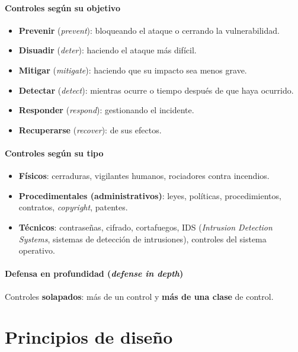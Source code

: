 \documentclass[11pt,a4paper]{report}
\begin{document}
\subsubsection*{Controles según su objetivo}
\begin{itemize}
  \item \textbf{Prevenir} (\emph{prevent}): bloqueando el ataque o cerrando la vulnerabilidad.
  \item \textbf{Disuadir} (\emph{deter}): haciendo el ataque más difícil.
  \item \textbf{Mitigar} (\emph{mitigate}): haciendo que su impacto sea menos grave.
  \item \textbf{Detectar} (\emph{detect}): mientras ocurre o tiempo después de que haya ocurrido.
  \item \textbf{Responder} (\emph{respond}): gestionando el incidente.
  \item \textbf{Recuperarse} (\emph{recover}): de sus efectos.
\end{itemize}

\subsubsection*{Controles según su tipo}
\begin{itemize}
  \item \textbf{Físicos}: cerraduras, vigilantes humanos, rociadores contra incendios.
  \item \textbf{Procedimentales (administrativos)}: leyes, políticas, procedimientos, contratos, \emph{copyright}, patentes.
  \item \textbf{Técnicos}: contraseñas, cifrado, cortafuegos, IDS (\emph{Intrusion Detection Systems}, sistemas de detección de intrusiones), controles del sistema operativo.
\end{itemize}

\subsubsection*{Defensa en profundidad (\emph{defense in depth})}
\begin{importante}
Controles \textbf{solapados}: más de un control y \textbf{más de una clase} de control.
\end{importante}

\chapter{Principios de diseño}
\end{document}
